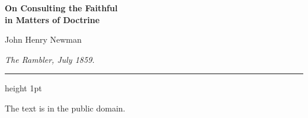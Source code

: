 \documentclass[11pt,letterpaper]{article}
\begin{document}
\color{ink}

\begin{center}
{\LARGE\bfseries\color{heading} On Consulting the Faithful\\[0.3em]
in Matters of Doctrine\par}
\vspace{1.2em}
{\large John Henry Newman\par}
\vspace{0.6em}
{\itshape\color{subhead} The Rambler, July 1859.\par}
\vspace{0.4em}
{\color{accent}\hrule height 1pt}
\end{center}
\vspace{1em}



\vspace{2em}
{\small\noindent The text is in the public domain.\par}
\end{document}
